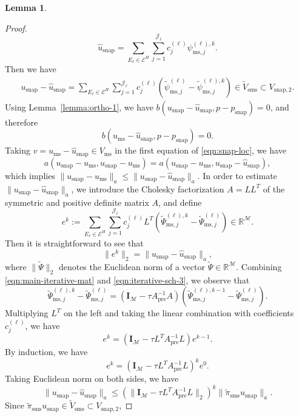 \documentclass{article}[11pt]
\theoremstyle{definition}
\newtheorem{lemma}{Lemma}[section]
\begin{document}
\begin{lemma}
\begin{proof}
\[
\hat{u}_{\text{snap}} = 
\sum_{E_\ell \in \mathcal{E}^H} \sum_{j=1}^{\mathcal{J}_\ell} 
c_{j}^{(\ell)} \psi_{\text{ms},j}^{(\ell),k}.
\]
Then we have 
\[
\begin{split}
u_{\text{snap}} - \hat{u}_{\text{snap}} = \sum_{E_\ell \in \mathcal{E}^H} \sum_{j=1}^{\mathcal{J}_\ell} 
c_{j}^{(\ell)} (\tilde{\psi}_{\text{ms},j}^{(\ell)} - \tilde{\psi}_{\text{ms},j}^{(\ell),k}) \in \tilde{V}_{\text{sms}} \subset V_{\text{snap},2}.
\end{split}
\]
Using Lemma~\ref{lemma:ortho-1}, we have 
$b(u_{\text{snap}} - \hat{u}_{\text{snap}}, p - p_{\text{snap}}) = 0$, and therefore 
\[ b(u_{\text{ms}} - \hat{u}_{\text{snap}}, p - p_{\text{snap}}) = 0.
\] 
Taking $v = u_{\text{ms}} - \hat{u}_{\text{snap}} \in V_{\text{ms}}$ in the first equation of \eqref{eqn:snap-loc}, we have 
\[ a(u_{\text{snap}}-u_{\text{ms}},u_{\text{snap}}-u_{\text{ms}}) = a(u_{\text{snap}}-u_{\text{ms}}, u_{\text{snap}} - \hat{u}_{\text{snap}}), \]
which implies $\| u_{\text{snap}}-u_{\text{ms}} \|_a \leq \| u_{\text{snap}} - \hat{u}_{\text{snap}} \|_a$. 
In order to estimate $\| u_{\text{snap}} - \hat{u}_{\text{snap}} \|_a$, we introduce the Cholesky factorization 
$A = LL^T$ of the symmetric and positive definite matrix $A$, and define 
\[ e^k := \sum_{E_\ell \in \mathcal{E}^H} \sum_{j=1}^{\mathcal{J}_\ell} c_j^{(\ell)} L^T(\tilde\Psi_{\text{ms}, j}^{(\ell),k} - \tilde\Psi_{\text{ms}, j}^{(\ell)}) \in \mathbb{R}^\mathcal{M}. \]
Then it is straightforward to see that 
\[ 
\|e^k\|_2 = \| u_{\text{snap}} - \hat{u}_{\text{snap}} \|_a,
\]
where $\| \tilde{\Psi} \|_2$ denotes the Euclidean norm of a vector $\tilde{\Psi} \in \mathbb{R}^{\mathcal{M}}$. 
Combining \eqref{eqn:main-iterative-mat} and \eqref{eqn:iterative-sch-3}, we observe that 
\[
\tilde\Psi_{\text{ms}, j}^{(\ell),k} - \tilde\Psi_{\text{ms}, j}^{(\ell)} = (\mathbf{I}_{\mathcal{M}} - \tau A_{\text{pre}}^{-1} A) (\tilde\Psi_{\text{ms}, j}^{(\ell), k-1} - \tilde\Psi_{\text{ms}, j}^{(\ell)}). 
\]
Multiplying $L^T$ on the left and taking the linear combination with coefficients $c_j^{(\ell)}$, we have 
\[
e^k = (\mathbf{I}_{\mathcal{M}} - \tau L^T A_{\text{pre}}^{-1} L) e^{k-1}. 
\]
By induction, we have 
\[
e^k = (\mathbf{I}_{\mathcal{M}} - \tau L^T A_{\text{pre}}^{-1} L)^k e^0. 
\]
Taking Euclidean norm on both sides, we have 
\[
\| u_{\text{snap}} - \hat{u}_{\text{snap}} \|_a \leq \left ( \| \mathbf{I}_{\mathcal{M}} - \tau L^T A_{\text{pre}}^{-1} L \|_2\right)^k \| \tilde{\pi}_{\text{sms}} u_{\text{snap}} \|_a. 
\]
Since $\tilde{\pi}_{\text{sms}} u_{\text{snap}} \in \tilde{V}_{\text{sms}} \subset V_{\text{snap},2}$, 

\end{proof}
\end{lemma}
\end{document}
